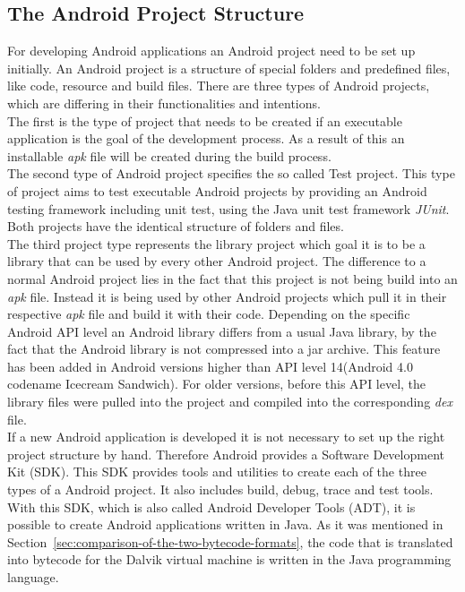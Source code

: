 \subsection{The Android Project Structure}
\label{sec:migration:the-android-project-structure}
For developing Android applications an Android project need to be set up initially.
An Android project is a structure of special folders and predefined files, like code, resource and build files.
There are three types of Android projects, which are differing in their functionalities and intentions.\\
The first is the type of project that needs to be created if an executable application is the goal of the development process.
As a result of this an installable \textit{apk} file will be created during the build process.\\
The second type of Android project specifies the so called Test project.
This type of project aims to test executable Android projects by providing an Android testing framework including unit test, using the Java unit test framework \textit{JUnit}.
Both projects have the identical structure of folders and files.\\
The third project type represents the library project which goal it is to be a library that can be used by every other Android project.
The difference to a normal Android project lies in the fact that this project is not being build into an \textit{apk} file.
Instead it is being used by other Android projects which pull it in their respective \textit{apk} file and build it with their code.
Depending on the specific Android API level an Android library differs from a usual Java library, by the fact that the Android library is not compressed into a jar archive.
This feature has been added in Android versions higher than API level 14(Android 4.0 codename Icecream Sandwich).
For older versions, before this API level, the library files were pulled into the project and compiled into the corresponding \textit{dex} file.\\
If a new Android application is developed it is not necessary to set up the right project structure by hand.
Therefore Android provides a Software Development Kit (SDK).
This SDK provides tools and utilities to create each of the three types of a Android project.
It also includes build, debug, trace and test tools.
With this SDK, which is also called Android Developer Tools (ADT), it is possible to create Android applications written in Java.
As it was mentioned in Section~\ref{sec:comparison-of-the-two-bytecode-formats}, the code that is translated into bytecode for the Dalvik virtual machine is written in the Java programming language.
